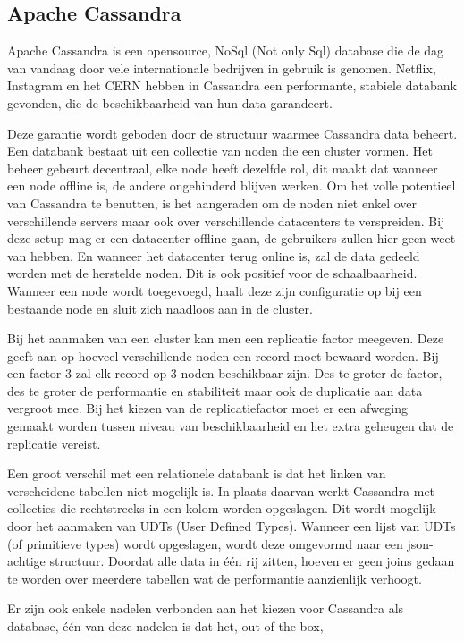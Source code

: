 \documentclass{article}
\begin{document}
	\subsection{Apache Cassandra}
	Apache Cassandra is een opensource, NoSql (Not only Sql) database die de dag van vandaag door vele internationale bedrijven 
	in gebruik is genomen. 
	Netflix, Instagram en het CERN hebben in Cassandra een performante, stabiele databank gevonden, 
	die de beschikbaarheid van hun data garandeert.
	\par
	Deze garantie wordt geboden door de structuur waarmee Cassandra data beheert. 
	Een databank bestaat uit een collectie van noden die een cluster vormen. 
	Het beheer gebeurt decentraal, elke node heeft dezelfde rol, 
	dit maakt dat wanneer een node offline is, de andere ongehinderd blijven werken. 
	Om het volle potentieel van Cassandra te benutten, is het aangeraden om de noden niet enkel over verschillende servers 
	maar ook over verschillende datacenters te verspreiden. 
	Bij deze setup mag er een datacenter offline gaan, de gebruikers zullen hier geen weet van hebben.  
	En wanneer het datacenter terug online is, zal de data gedeeld worden met de herstelde noden.
	Dit is ook positief voor de schaalbaarheid. 
	Wanneer een node wordt toegevoegd, haalt deze zijn configuratie op bij een bestaande node en sluit zich naadloos aan in de cluster.
	\par
	Bij het aanmaken van een cluster kan men een replicatie factor meegeven. 
	Deze geeft aan op hoeveel verschillende noden een record moet bewaard worden. 
	Bij een factor 3 zal elk record op 3 noden beschikbaar zijn. 
	Des te groter de factor, des te groter de performantie en stabiliteit maar ook de duplicatie aan data vergroot mee.
	Bij het kiezen van de replicatiefactor moet er een afweging gemaakt worden tussen niveau van beschikbaarheid en
	het extra geheugen dat de replicatie vereist.
	\par
	Een groot verschil met een relationele databank is dat het linken van verscheidene tabellen niet mogelijk is.
	In plaats daarvan werkt Cassandra met collecties die rechtstreeks in een kolom worden opgeslagen. 
	Dit wordt mogelijk door het aanmaken van UDTs (User Defined Types). 
	Wanneer een lijst van UDTs (of primitieve types) wordt opgeslagen, wordt deze omgevormd naar een json-achtige structuur. 
	Doordat alle data in één rij zitten, hoeven er geen joins gedaan te worden over meerdere tabellen 
	wat de performantie aanzienlijk verhoogt.
	\par
	Er zijn ook enkele nadelen verbonden aan het kiezen voor Cassandra als database, één van deze nadelen is dat het, out-of-the-box,
\end{document}
